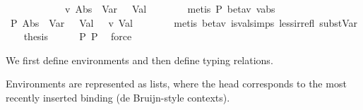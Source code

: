 \begin{isabellebody}
\ \ \ \ \ \ \ \ \ \ \ \ {\isasymrightarrow}\isactrlsub v\ {\isacharparenleft}{\kern0pt}{\isacharparenleft}{\kern0pt}Abs\ {\isasymtau}{}\ {\isacharparenleft}{\kern0pt}Var\ {}{\isacharparenright}{\kern0pt}{\isacharparenright}{\kern0pt}\ {\isasymcdot}\ Val\ {}\ {}{\isacharparenright}{\kern0pt}{\isachardoublequoteclose}\isanewline
\ \ \ \ \isamarkupfalse%
\ {\isacharparenleft}{\kern0pt}metis\ P{}\ beta{\isacharunderscore}{\kern0pt}v\ v{\isacharunderscore}{\kern0pt}abs{\isacharparenright}{\kern0pt}\isanewline
\isanewline
\ \ \isamarkupfalse%
\ P{}{\isacharcolon}{\kern0pt}\ {\isachardoublequoteopen}{\isacharparenleft}{\kern0pt}{\isacharparenleft}{\kern0pt}Abs\ {\isasymtau}{}\ {\isacharparenleft}{\kern0pt}Var\ {}{\isacharparenright}{\kern0pt}{\isacharparenright}{\kern0pt}\ {\isasymcdot}\ Val\ {}\ {}{\isacharparenright}{\kern0pt}\ {\isasymrightarrow}\isactrlsub v\ Val\ {}\ {}{\isachardoublequoteclose}\isanewline
\ \ \ \ \isamarkupfalse%
\ {\isacharparenleft}{\kern0pt}metis\ beta{\isacharunderscore}{\kern0pt}v\ is{\isacharunderscore}{\kern0pt}val{\isachardot}{\kern0pt}simps\ less{\isacharunderscore}{\kern0pt}irrefl\ subst{\isacharunderscore}{\kern0pt}Var{\isacharparenright}{\kern0pt}\isanewline
\isanewline
\ \ \isamarkupfalse%
\ {\isacharquery}{\kern0pt}thesis\isanewline
\ \ \ \ \isamarkupfalse%
\ P{}\ P{}\ \isamarkupfalse%
\ force\isanewline
{}\isamarkupfalse%
%
\endisatagproof
{\isafoldproof}%
%
\isadelimproof
%
\endisadelimproof
%
\isadelimdocument
%
\endisadelimdocument
%
\isatagdocument
%
\isamarkuptrue%
%
\endisatagdocument
{\isafolddocument}%
%
\isadelimdocument
%
\endisadelimdocument
%
\begin{isamarkuptext}%
We first define environments and then define typing relations.%
\end{isamarkuptext}\isamarkuptrue%
%
\isadelimdocument
%
\endisadelimdocument
%
\isatagdocument
%
\isamarkuptrue%
%
\endisatagdocument
{\isafolddocument}%
%
\isadelimdocument
%
\endisadelimdocument
%
\begin{isamarkuptext}%
Environments are represented as lists, where the head corresponds to the
  most recently inserted binding (de Bruijn-style contexts).%
\end{isamarkuptext}\isamarkuptrue%

\end{isabellebody}
